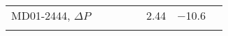 \documentclass[tc, manuscript]{copernicus}
\begin{document}
\begin{table*}
{\begin{tabular}{lccccccl}
        MD01-2444, $\Delta P$ &&&&& 2.44 & $-$10.6 \\

        \bottomhline
      \end{tabular}}


    \end{table*}


\end{document}
